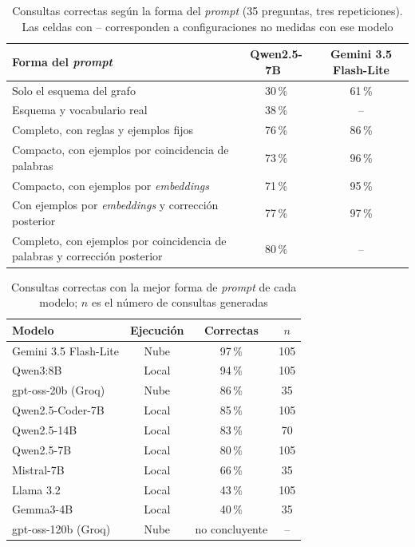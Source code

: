\documentclass[11pt, a4paper]{report}
\begin{document}
	\begin{table}[H]
		\centering
		\begin{tabularx}{\linewidth}{|>{\raggedright\arraybackslash}X|c|c|}
			\hline
			\rowcolor{tabla-header}
			\textbf{Forma del \textit{prompt}} & \textbf{Qwen2.5-7B}~\cite{qwen25} & \textbf{Gemini 3.5 Flash-Lite} \\
			\hline
			Solo el esquema del grafo & 30\,\% & 61\,\% \\
			\hline
			\rowcolor{fila-alterna}
			Esquema y vocabulario real & 38\,\% & -- \\
			\hline
			Completo, con reglas y ejemplos fijos & 76\,\% & 86\,\% \\
			\hline
			\rowcolor{fila-alterna}
			Compacto, con ejemplos por coincidencia de palabras & 73\,\% & 96\,\% \\
			\hline
			Compacto, con ejemplos por \textit{embeddings} & 71\,\% & 95\,\% \\
			\hline
			\rowcolor{fila-alterna}
			Con ejemplos por \textit{embeddings} y corrección posterior & 77\,\% & 97\,\% \\
			\hline
			Completo, con ejemplos por coincidencia de palabras y corrección posterior & 80\,\% & -- \\
			\hline
		\end{tabularx}
		\caption[Consultas correctas según la forma del \textit{prompt}]{Consultas correctas según la forma del \textit{prompt} (35 preguntas, tres repeticiones). Las celdas con -- corresponden a configuraciones no medidas con ese modelo}
		\label{tab:sparql-prompt}
	\end{table}

	\begin{table}[H]
		\centering
		\begin{tabular}{|l|c|c|c|}
			\hline
			\rowcolor{tabla-header}
			\textbf{Modelo} & \textbf{Ejecución} & \textbf{Correctas} & \textbf{$n$} \\
			\hline
			Gemini 3.5 Flash-Lite & Nube & 97\,\% & 105 \\
			\hline
			\rowcolor{fila-alterna}
			Qwen3:8B & Local & 94\,\% & 105 \\
			\hline
			gpt-oss-20b (Groq) & Nube & 86\,\% & 35 \\
			\hline
			\rowcolor{fila-alterna}
			Qwen2.5-Coder-7B & Local & 85\,\% & 105 \\
			\hline
			Qwen2.5-14B & Local & 83\,\% & 70 \\
			\hline
			\rowcolor{fila-alterna}
			Qwen2.5-7B & Local & 80\,\% & 105 \\
			\hline
			Mistral-7B & Local & 66\,\% & 35 \\
			\hline
			\rowcolor{fila-alterna}
			Llama 3.2 & Local & 43\,\% & 105 \\
			\hline
			Gemma3-4B & Local & 40\,\% & 35 \\
			\hline
			\rowcolor{fila-alterna}
			gpt-oss-120b (Groq) & Nube & no concluyente & -- \\
			\hline
		\end{tabular}
		\caption{Consultas correctas con la mejor forma de \textit{prompt} de cada modelo; $n$ es el número de consultas generadas}
		\label{tab:sparql-modelos}
	\end{table}
\end{document}

